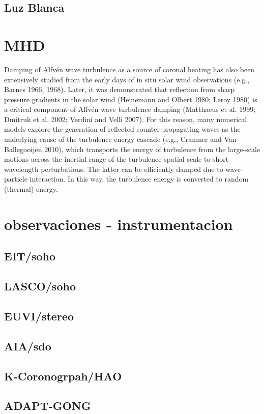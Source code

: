 \subsection{Luz Blanca}



\section{MHD}
Damping of Alfvén wave turbulence as a source of coronal heating has also been extensively studied from the early days of in situ solar wind observations (e.g., Barnes 1966, 1968). Later, it was demonstrated that reflection from sharp pressure gradients in the solar wind (Heinemann and Olbert 1980; Leroy 1980) is a critical component of Alfvén wave turbulence damping (Matthaeus et al. 1999; Dmitruk et al. 2002; Verdini and Velli 2007). For this reason, many numerical models explore the generation of reflected counter-propagating waves as the underlying cause of the turbulence energy cascade (e.g., Cranmer and Van Ballegooijen 2010), which transports the energy of turbulence from the large-scale motions across the inertial range of the turbulence spatial scale to short-wavelength perturbations. The latter can be efficiently damped due to wave–particle interaction. In this way, the turbulence energy is converted to random (thermal) energy.

\section{observaciones - instrumentacion}
\subsection{EIT/soho}
\subsection{LASCO/soho}
\subsection{EUVI/stereo}
\subsection{AIA/sdo}
\subsection{K-Coronogrpah/HAO}
\subsection{ADAPT-GONG}

